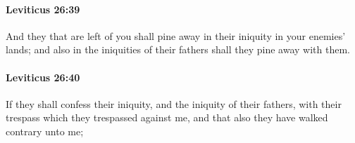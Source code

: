 		\paragraph{Leviticus 26:39} %
			\label{LEVITICUS-26-39}

			And they that are left of you shall pine away in their iniquity in your enemies’ lands; and also in the iniquities of their fathers shall they pine away with them.


		\paragraph{Leviticus 26:40} %
			\label{LEVITICUS-26-40}

			If they shall confess their iniquity, and the iniquity of their fathers, with their trespass which they trespassed against me, and that also they have walked contrary unto me;


